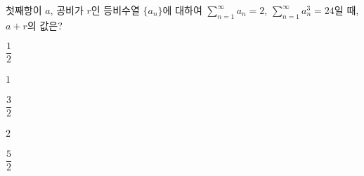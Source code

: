 첫째항이 $a$, 공비가 $r$인 등비수열 $\{a_n\}$에 대하여 $\displaystyle\sum_{n=1}^{\infty}a_n=2$, $\displaystyle\sum_{n=1}^{\infty}a_n^3=24$일 때, $a+r$의 값은?
\begin{choices32}{\rule[-3ex]{0pt}{8ex}$\dfrac{1}{2}$}{\rule[-3ex]{0pt}{8ex}$1$}{\rule[-3ex]{0pt}{8ex}$\dfrac{3}{2}$}{\rule[-3ex]{0pt}{8ex}$2$}{\rule[-3ex]{0pt}{8ex}$\dfrac{5}{2}$}\end{choices32}
